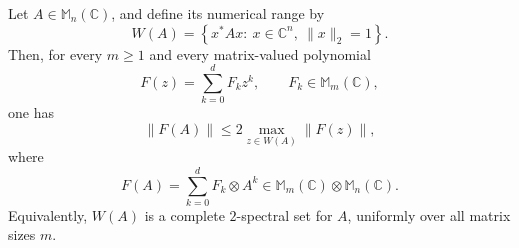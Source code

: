\documentclass{article}
\begin{document}
Let \(A\in\mathbb{M}_n(\mathbb{C})\), and define its numerical range by
\[
W(A)=\left\{x^*Ax:\ x\in\mathbb{C}^n,\ \|x\|_2=1\right\}.
\]
Then, for every \(m\geq1\) and every matrix-valued polynomial
\[
F(z)=\sum_{k=0}^d F_k z^k,
\qquad F_k\in\mathbb{M}_m(\mathbb{C}),
\]
one has
\[
\boxed{
\left\|F(A)\right\|
\leq
2\max_{z\in W(A)}\left\|F(z)\right\|,
}
\]
where
\[
F(A)=\sum_{k=0}^d F_k\otimes A^k
\in\mathbb{M}_m(\mathbb{C})\otimes\mathbb{M}_n(\mathbb{C}).
\]
Equivalently, \(W(A)\) is a complete \(2\)-spectral set for \(A\), uniformly
over all matrix sizes \(m\).
\end{document}
